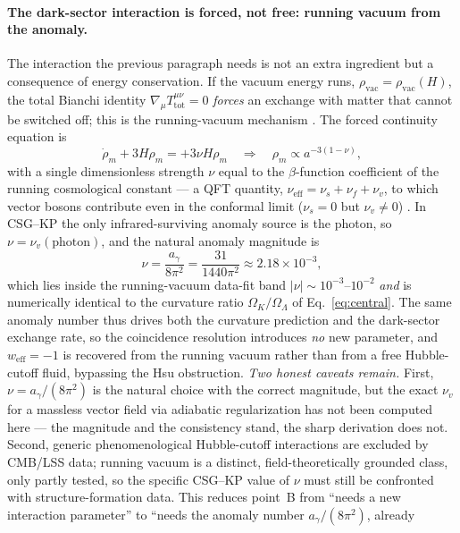 \documentclass[11pt,a4paper]{article}
\theoremstyle{plain}
\theoremstyle{definition}
\theoremstyle{remark}
\newcommand{\Ok}{\Omega_K}
\newcommand{\OL}{\Omega_\Lambda}
\newcommand{\ag}{a_\gamma}
\begin{document}
\paragraph{The dark-sector interaction is forced, not free: running vacuum from the anomaly.}
The interaction the previous paragraph needs is not an extra ingredient but a consequence of energy
conservation. If the vacuum energy runs, $\rho_{\mathrm{vac}}=\rho_{\mathrm{vac}}(H)$, the total
Bianchi identity $\nabla_\mu T^{\mu\nu}_{\mathrm{tot}}=0$ \emph{forces} an exchange with matter
that cannot be switched off; this is the running-vacuum mechanism
\cite{BilicEtAl2007,SolaPeracaula2021}. The forced continuity equation is
\begin{equation}
\dot\rho_m + 3H\rho_m = +3\nu H\rho_m \quad\Longrightarrow\quad \rho_m \propto a^{-3(1-\nu)} ,
\end{equation}
with a single dimensionless strength $\nu$ equal to the $\beta$-function coefficient of the running
cosmological constant --- a QFT quantity, $\nu_{\mathrm{eff}}=\nu_s+\nu_f+\nu_v$, to which vector
bosons contribute even in the conformal limit ($\nu_s=0$ but $\nu_v\neq0$)
\cite{SolaPeracaula2021}. In CSG--KP the only infrared-surviving anomaly source is the photon, so
$\nu=\nu_v(\text{photon})$, and the natural anomaly magnitude is
\begin{equation}
\nu = \frac{\ag}{8\pi^2} = \frac{31}{1440\pi^2} \approx 2.18\times10^{-3} ,
\end{equation}
which lies inside the running-vacuum data-fit band $|\nu|\sim10^{-3}$--$10^{-2}$ \emph{and} is
numerically identical to the curvature ratio $\Ok/\OL$ of Eq.~\eqref{eq:central}. The same anomaly
number thus drives both the curvature prediction and the dark-sector exchange rate, so the
coincidence resolution introduces \emph{no} new parameter, and $w_{\mathrm{eff}}=-1$ is recovered
from the running vacuum rather than from a free Hubble-cutoff fluid, bypassing the Hsu obstruction.
\emph{Two honest caveats remain.} First, $\nu=\ag/(8\pi^2)$ is the natural choice with the correct
magnitude, but the exact $\nu_v$ for a massless vector field via adiabatic regularization has not
been computed here --- the magnitude and the consistency stand, the sharp derivation does not.
Second, generic phenomenological Hubble-cutoff interactions are excluded by CMB/LSS data; running
vacuum is a distinct, field-theoretically grounded class, only partly tested, so the specific
CSG--KP value of $\nu$ must still be confronted with structure-formation data. This reduces point~B
from ``needs a new interaction parameter'' to ``needs the anomaly number $\ag/(8\pi^2)$, already
\end{document}
